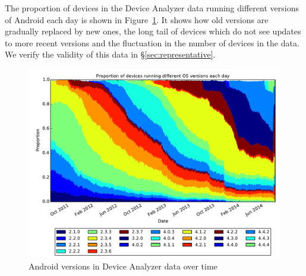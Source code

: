 \documentclass[conference,a4paper,twoside]{IEEEtran}
\begin{document}
The proportion of devices in the Device Analyzer data running different versions of Android each day is shown in Figure~\ref{fig:norm_os}.
It shows how old versions are gradually replaced by new ones, the long tail of devices which do not see updates to more recent versions and the fluctuation in the number of devices in the data.
We verify the validity of this data in \S\ref{sec:representative}.
\begin{figure}
 \centering
 \includegraphics[width=\columnwidth]{figures/da_norm_os}
 \caption{Android versions in Device Analyzer data over time}
 \label{fig:norm_os}
\end{figure}
\end{document}
